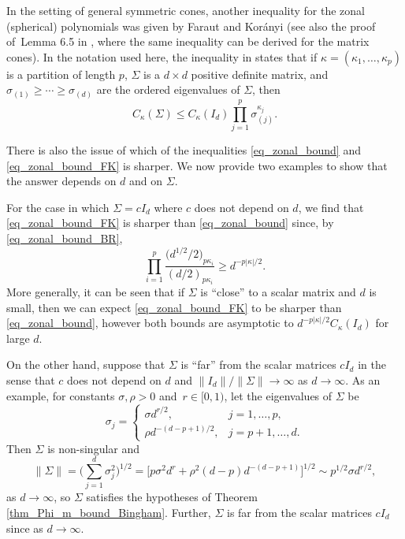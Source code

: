 \documentclass[pdftex]{sigma}
\numberwithin{equation}{section}
\begin{document}
\begin{Remark}
\label{rem_zonal_bound_2}
{\rm In the setting of general symmetric cones, another inequality for the zonal (spherical) polynomials was given by Faraut and Kor\'anyi \cite[Theorem XII.1.1]{FarautKoranyi} (see also the proof of~Lemma 6.5 in \cite{GrossRichards}, where the same inequality can be derived for the matrix cones). In the notation used here, the inequality in \cite[loc.~cit.]{FarautKoranyi} states that if $\kappa = (\kappa_1,\ldots,\kappa_p)$ is a partition of length $p$, $\Sigma$ is a $d \times d$ positive definite matrix, and $\sigma_{(1)} \ge \cdots \ge \sigma_{(d)}$ are the ordered eigenvalues of $\Sigma$, then
\begin{equation}
\label{eq_zonal_bound_FK}
C_\kappa(\Sigma) \le C_\kappa(I_d) \prod_{j=1}^p \sigma_{(j)}^{\kappa_j}.
\end{equation}

There is also the issue of which of the inequalities \eqref{eq_zonal_bound} and \eqref{eq_zonal_bound_FK} is sharper. We now provide two examples to show that the answer depends on $d$ and on $\Sigma$.

For the case in which $\Sigma = cI_d$ where $c$ does not depend on $d$, we find that \eqref{eq_zonal_bound_FK} is sharper than \eqref{eq_zonal_bound} since, by \eqref{eq_zonal_bound_BR},
\[
\prod_{i=1}^p \frac{\bigl(d^{1/2}/2\bigr)_{p \kappa_i}}{(d/2)_{p \kappa_i}} \ge d^{-p |\kappa|/2}.
\]
More generally, it can be seen that if $\Sigma$ is ``close'' to a scalar matrix and $d$ is small, then we can expect \eqref{eq_zonal_bound_FK} to be sharper than \eqref{eq_zonal_bound}, however both bounds are asymptotic to $d^{-p |\kappa|/2} C_\kappa(I_d)$ for large $d$.

On the other hand, suppose that $\Sigma$ is ``far'' from the scalar matrices $cI_d$ in the sense that $c$ does not depend on $d$ and $\|I_d\|/\|\Sigma\| \to \infty$ as $d \to \infty$. As an example, for constants $\sigma, \rho > 0$ and~${r \in [0,1)}$, let the eigenvalues of $\Sigma$ be
\[
\sigma_j = \begin{cases}
\sigma d^{r/2}, & j=1,\ldots,p, \\
\rho d^{-(d-p+1)/2}, & j=p+1,\ldots,d.
\end{cases}
\]
Then $\Sigma$ is non-singular and
\[
\|\Sigma\| = \Biggl(\sum_{j=1}^d \sigma_j^2\Biggr)^{1/2} = \bigl[p \sigma^2 d^{r} + \rho^2 (d-p) d^{-(d-p+1)}\bigr]^{1/2} \sim p^{1/2} \sigma d^{r/2},
\]
as $d \to \infty$, so $\Sigma$ satisfies the hypotheses of Theorem \ref{thm_Phi_m_bound_Bingham}. Further, $\Sigma$ is far from the scalar matrices $cI_d$ since  as $d \to \infty$.

}
\end{Remark}
\end{document}
